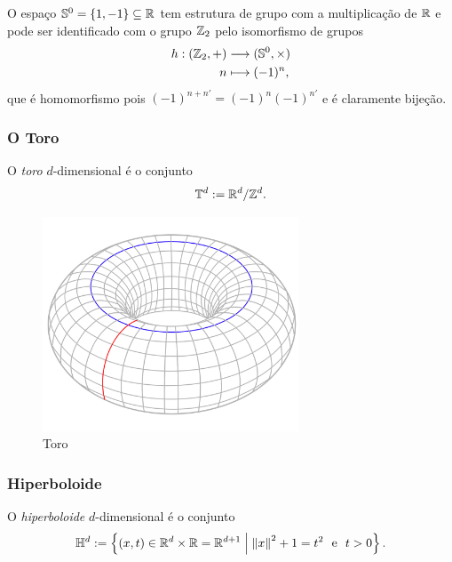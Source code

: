 O espaço $\mathbb{S}^0 = \{1,-1\} \subseteq \mathbb{R}$ tem estrutura de grupo com a multiplicação de $\mathbb{R}$ e pode ser identificado com o grupo $\mathbb{Z}_2$ pelo isomorfismo de grupos
	\begin{align*}
	{h}: {(\mathbb{Z}_2,+)} &\longrightarrow {(\mathbb{S}^0,\times)} \\{n} &\longmapsto {(-1)^n},
	\end{align*}
que é homomorfismo pois $(-1)^{n+n'} = (-1)^n(-1)^{n'}$ e é claramente bijeção.

\subsubsection{O Toro}

\begin{defi}
	O \emph{toro} $d$-dimensional é o conjunto
	\begin{equation*}
	\mathbb{T}^d := \mathbb{R}^d / \mathbb{Z}^d.
	\end{equation*}
\end{defi}

\begin{figure}[!h]
\centering
\includegraphics[width=3in]{./imagens/toro}
\caption{Toro}
\end{figure}

\subsubsection{Hiperboloide}

\begin{defi}
O \emph{hiperboloide} $d$-dimensional é o conjunto
	\begin{equation*}
	\mathbb{H}^d := \left\{(x,t) \in \mathbb{R}^d \times \mathbb{R} = \mathbb{R}^{d+1} \;\middle\vert\; \left\Vert{x}\right\Vert^2+1=t^2 \text{\ \ e\ \ } t>0 \right\}.
	\end{equation*}
\end{defi}





